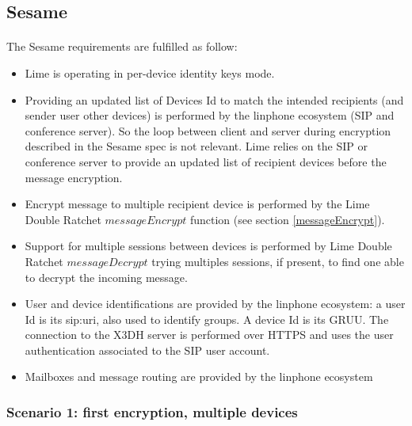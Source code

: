 \documentclass[a4paper,11pt]{article}
\begin{document}
  \subsection{Sesame}
    \paragraph{}The Sesame requirements are fulfilled as follow:
    \begin{itemize}
      \item Lime is operating in per-device identity keys mode.
      \item Providing an updated list of Devices Id to match the intended recipients (and sender user other devices) is performed by the linphone ecosystem (SIP and conference server). So the loop between client and server during encryption described in the Sesame spec\cite{sesame} is not relevant. Lime relies on the SIP or conference server to provide an updated list of recipient devices before the message encryption.
      \item Encrypt message to multiple recipient device is performed by the Lime Double Ratchet $messageEncrypt$ function (see section \ref{messageEncrypt}).
      \item Support for multiple sessions between devices is performed by Lime Double Ratchet $messageDecrypt$ trying multiples sessions, if present, to find one able to decrypt the incoming message.
      \item User and device identifications are provided by the linphone ecosystem: a user Id is its sip:uri, also used to identify groups. A device Id is its GRUU\cite{rfc5627}. The connection to the X3DH server is performed over HTTPS and uses the user authentication associated to the SIP user account.
      \item Mailboxes and message routing are provided by the linphone ecosystem
    \end{itemize}
   
    \newpage
    \subsubsection{Scenario 1: first encryption, multiple devices}
\end{document}

